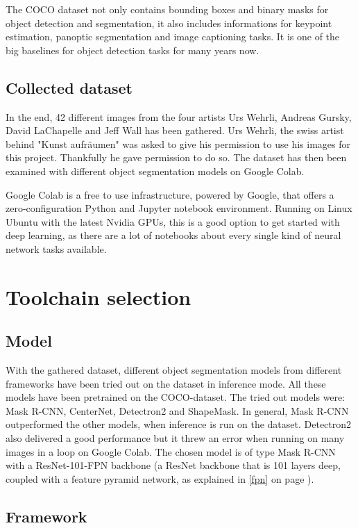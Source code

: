 The COCO dataset not only contains bounding boxes and binary masks for object detection and segmentation, it also includes informations for keypoint estimation, panoptic segmentation and image captioning tasks. It is one of the big baselines for object detection tasks for many years now.

\subsection{Collected dataset}

In the end, 42 different images from the four artists Urs Wehrli, Andreas Gursky, David LaChapelle and Jeff Wall has been gathered. Urs Wehrli, the swiss artist behind "Kunst aufräumen" was asked to give his permission to use his images for this project. Thankfully he gave permission to do so. The dataset has then been examined with different object segmentation models on Google Colab.

Google Colab is a free to use infrastructure, powered by Google, that offers a zero-configuration Python and Jupyter notebook environment. Running on Linux Ubuntu with the latest Nvidia GPUs, this is a good option to get started with deep learning, as there are a lot of notebooks about every single kind of neural network tasks available.

\section{Toolchain selection}

\subsection{Model}

With the gathered dataset, different object segmentation models from different frameworks have been tried out on the dataset in inference mode. All these models have been pretrained on the COCO-dataset.
The tried out models were: Mask R-CNN, CenterNet, Detectron2 and ShapeMask. In general, Mask R-CNN outperformed the other models, when inference is run on the dataset. Detectron2 also delivered a good performance but it threw an error when running on many images in a loop on Google Colab. The chosen model is of type Mask R-CNN with a ResNet-101-FPN backbone (a ResNet backbone that is 101 layers deep, coupled with a feature pyramid network, as explained in \ref{fpn} on page \pageref{fpn}).

\subsection{Framework}

